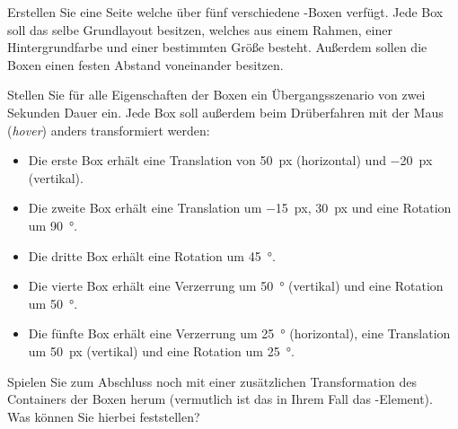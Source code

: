 %
\par Erstellen Sie eine Seite welche über fünf verschiedene -Boxen verfügt. Jede Box soll das selbe Grundlayout besitzen, welches aus einem Rahmen, einer Hintergrundfarbe und einer bestimmten Größe besteht. Außerdem sollen die Boxen einen festen Abstand voneinander besitzen.
%
\par Stellen Sie für alle Eigenschaften der Boxen ein Übergangsszenario von zwei Sekunden Dauer ein. Jede Box soll außerdem beim Drüberfahren mit der Maus (\emph{hover}) anders transformiert werden:
%
\begin{itemize}
\item Die erste Box erhält eine Translation von \qty{50}{px} (horizontal) und \qty{-20}{px} (vertikal).
\item Die zweite Box erhält eine Translation um \qty{-15}{px}, \qty{30}{px} und eine Rotation um \qty{90}{\degree}.
\item Die dritte Box erhält eine Rotation um \qty{45}{\degree}.
\item Die vierte Box erhält eine Verzerrung um \qty{50}{\degree} (vertikal) und eine Rotation um \qty{50}{\degree}.
\item Die fünfte Box erhält eine Verzerrung um \qty{25}{\degree} (horizontal), eine Translation um \qty{50}{px} (vertikal) und eine Rotation um \qty{25}{\degree}.
\end{itemize}
%
\par Spielen Sie zum Abschluss noch mit einer zusätzlichen Transformation des Containers der Boxen herum (vermutlich ist das in Ihrem Fall das -Element). Was können Sie hierbei feststellen?